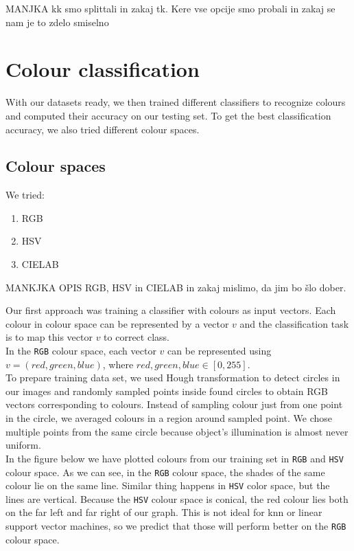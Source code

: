 \documentclass[12pt,a4paper]{article}
\begin{document}
	MANJKA kk smo splittali in zakaj tk. Kere vse opcije smo probali in zakaj se nam je to zdelo smiselno
	
	\section{Colour classification}

	With our datasets ready, we then trained different classifiers to recognize colours and computed their accuracy on our testing set. To get the best classification accuracy, we also tried different colour spaces. 

	\subsection{Colour spaces}

	We tried:

	\begin{enumerate}
		\item RGB
		\item HSV
		\item CIELAB
	\end{enumerate}

	MANKJKA OPIS RGB, HSV in CIELAB in zakaj mislimo, da jim bo šlo dober.
	

	Our first approach was training a classifier with colours as input vectors. Each colour in colour space can be represented by a vector $v$ and the classification task is to map this vector $v$ to correct class. \\
	
	In the \texttt{RGB} colour space, each vector $v$ can be represented using $v = (red, green, blue)$, where $red, green, blue \in [0, 255]$. \\
	
	To prepare training data set, we used Hough transformation to detect circles in our images and randomly sampled points inside found circles to obtain RGB vectors corresponding to colours. Instead of sampling colour just from one point in the circle, we averaged colours in a region around sampled point. We chose multiple points from the same circle because object's illumination is almost never uniform. \\
	
	In the figure below we have plotted colours from our training set in \texttt{RGB} and \texttt{HSV} colour space. As we can see, in the \texttt{RGB} colour space, the shades of the same colour lie on the same line. Similar thing happens in \texttt{HSV} color space, but the lines are vertical. Because the \texttt{HSV} colour space is conical, the red colour lies both on the far left and far right of our graph. This is not ideal for knn or linear support vector machines, so we predict that those will perform better on the \texttt{RGB} colour space. \\
	
\end{document}
